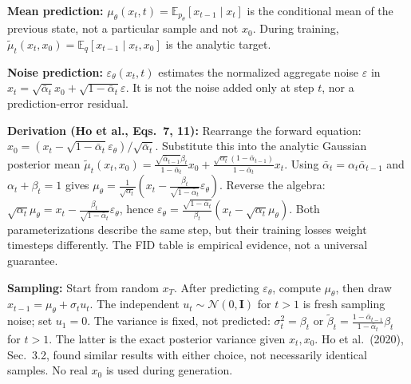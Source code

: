 \documentclass[aspectratio=169,9pt,xcolor=table]{beamer}
\newcommand{\E}{\mathbb{E}}
\newcommand{\Normal}{\mathcal{N}}
\newcommand{\Id}{\mathbf{I}}
\newcommand{\eps}{\varepsilon}
\newcommand{\ab}{\bar{\alpha}}
\begin{document}
\begin{frame}[t,shrink=12]
{\par\textbf{Mean prediction:} $\mu_\theta(x_t,t)=\E_{p_\theta}[x_{t-1}\mid x_t]$ is the conditional mean of the previous state, not a particular sample and not $x_0$. During training, $\tilde\mu_t(x_t,x_0)=\E_q[x_{t-1}\mid x_t,x_0]$ is the analytic target.
\par\textbf{Noise prediction:} $\eps_\theta(x_t,t)$ estimates the normalized aggregate noise $\eps$ in $x_t=\sqrt{\ab_t}x_0+\sqrt{1-\ab_t}\eps$. It is not the noise added only at step $t$, nor a prediction-error residual.
\par\textbf{Derivation (Ho et al., Eqs.~7, 11):} Rearrange the forward equation:
$\hat x_0=(x_t-\sqrt{1-\ab_t}\eps_\theta)/\sqrt{\ab_t}$.
Substitute this into the analytic Gaussian posterior mean
$\tilde\mu_t(x_t,x_0)=\frac{\sqrt{\ab_{t-1}}\beta_t}{1-\ab_t}x_0+\frac{\sqrt{\alpha_t}(1-\ab_{t-1})}{1-\ab_t}x_t$.
Using $\ab_t=\alpha_t\ab_{t-1}$ and $\alpha_t+\beta_t=1$ gives
$\mu_\theta=\frac{1}{\sqrt{\alpha_t}}(x_t-\frac{\beta_t}{\sqrt{1-\ab_t}}\eps_\theta)$.
Reverse the algebra: $\sqrt{\alpha_t}\mu_\theta=x_t-\frac{\beta_t}{\sqrt{1-\ab_t}}\eps_\theta$, hence $\eps_\theta=\frac{\sqrt{1-\ab_t}}{\beta_t}(x_t-\sqrt{\alpha_t}\mu_\theta)$. Both parameterizations describe the same step, but their training losses weight timesteps differently. The FID table is empirical evidence, not a universal guarantee.
\par\textbf{Sampling:} Start from random $x_T$. After predicting $\eps_\theta$, compute $\mu_\theta$, then draw $x_{t-1}=\mu_\theta+\sigma_t u_t$. The independent $u_t\sim\Normal(0,\Id)$ for $t>1$ is fresh sampling noise; set $u_1=0$. The variance is fixed, not predicted: $\sigma_t^2=\beta_t$ or $\tilde\beta_t=\frac{1-\ab_{t-1}}{1-\ab_t}\beta_t$ for $t>1$. The latter is the exact posterior variance given $x_t,x_0$. Ho et al.\ (2020), Sec.~3.2, found similar results with either choice, not necessarily identical samples. No real $x_0$ is used during generation.}
\end{frame}
\end{document}

